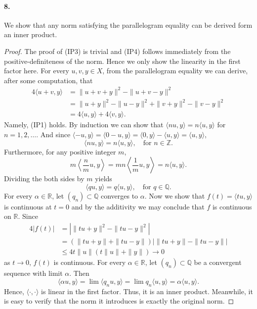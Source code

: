  \paragraph{8.}
    We show that any norm satisfying the parallelogram equality can be derived
    form an inner product.
  \begin{proof}
    The proof of (IP3) is trivial and (IP4) follows immediately from the
    positive-definiteness of the norm. Hence we only show the linearity in the
    first factor here. For every $u, v, y\in X$, from the parallelogram equality
    we can derive, after some computation, that
    \begin{align*}
      4\langle u+v, y\rangle &= \|u+v+y\|^2-\|u+v-y\|^2  \\
      &= \|u+y\|^2-\|u-y\|^2+\|v+y\|^2-\|v-y\|^2 \\
      &= 4\langle u, y\rangle + 4\langle v, y\rangle.
    \end{align*}
    Namely, (IP1) holds. By induction we can show that $\langle nu, y\rangle=
    n\langle u, y\rangle$ for $n=1,2,\dots$. And since $\langle -u, y\rangle =
    \langle 0-u, y\rangle = \langle 0, y\rangle - \langle u, y\rangle = \langle
    u, y\rangle$, 
    \[
      \langle nu, y\rangle = n\langle u, y\rangle,
      \quad\text{for $n\in\mathbb{Z}$}.
    \]
    Furthermore, for any positive integer $m$,
    \[
      m\left\langle\frac{n}{m}u, y\right\rangle = 
      mn\left\langle\frac{1}{m}u, y\right\rangle =
      n\langle u, y\rangle.
    \]
    Dividing the both sides by $m$ yields
    \[
      \langle qu, y\rangle = q\langle u, y\rangle,
      \quad\text{for $q\in\mathbb{Q}$}.
    \]
    For every $\alpha\in\mathbb{R}$, let $(q_n)\subset\mathbb{Q}$ converges to
    $\alpha$. Now we show that $f(t)=\langle tu, y\rangle$ is continuous at $t=
    0$ and by the additivity we may conclude that $f$ is continuous on
    $\mathbb{R}$. Since
    \begin{align*}
      4|f(t)| 
      &= |\|tu+y\|^2 - \|tu-y\|^2| \\
      &= (\|tu+y\|+\|tu-y\|)|\|tu+y\|-\|tu-y\|| \\
      &\le 4t\|u\|(t\|u\|+\|y\|) \to 0
    \end{align*}
    as $t\to 0$, $f(t)$ is continuous. For every $\alpha\in\mathbb{R}$, let 
    $(q_n)\subset\mathbb{Q}$ be a convergent sequence with limit $\alpha$. Then
    \[
      \langle\alpha u, y\rangle=
      \lim\langle q_nu, y\rangle=
      \lim q_n\langle u, y\rangle=
      \alpha\langle u, y\rangle.
    \]
    Hence, $\langle\cdot,\cdot\rangle$ is linear in the first factor. Thus, it
    is an inner product. Meanwhile, it is easy to verify that the norm it 
    introduces is exactly the original norm. 
  \end{proof}

